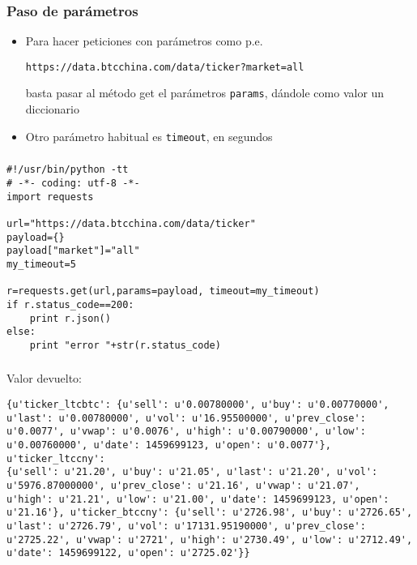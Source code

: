 \documentclass[ucs]{beamer}
\begin{document}
\begin{frame}[fragile]
\frametitle{Paso de parámetros}
\begin{itemize}
\item
Para hacer peticiones con parámetros como p.e.

  \begin{footnotesize}
  \begin{verbatim}
https://data.btcchina.com/data/ticker?market=all
  \end{verbatim}
  \end{footnotesize}

basta pasar al método get el parámetros \verb|params|, dándole como 
valor un diccionario
\item
Otro parámetro habitual es \verb|timeout|, en segundos

\end{itemize}

\end{frame}


\begin{frame}[fragile]
\frametitle{}


  \begin{footnotesize}
  \begin{verbatim}
#!/usr/bin/python -tt
# -*- coding: utf-8 -*-
import requests

url="https://data.btcchina.com/data/ticker"
payload={}
payload["market"]="all"
my_timeout=5

r=requests.get(url,params=payload, timeout=my_timeout)
if r.status_code==200:
    print r.json()
else:
    print "error "+str(r.status_code)
  \end{verbatim}
  \end{footnotesize}


\end{frame}
\begin{frame}[fragile]
\frametitle{}

Valor devuelto:

  \begin{scriptsize}
  \begin{verbatim}
{u'ticker_ltcbtc': {u'sell': u'0.00780000', u'buy': u'0.00770000',
u'last': u'0.00780000', u'vol': u'16.95500000', u'prev_close':
u'0.0077', u'vwap': u'0.0076', u'high': u'0.00790000', u'low':
u'0.00760000', u'date': 1459699123, u'open': u'0.0077'}, u'ticker_ltccny':
{u'sell': u'21.20', u'buy': u'21.05', u'last': u'21.20', u'vol':
u'5976.87000000', u'prev_close': u'21.16', u'vwap': u'21.07',
u'high': u'21.21', u'low': u'21.00', u'date': 1459699123, u'open':
u'21.16'}, u'ticker_btccny': {u'sell': u'2726.98', u'buy': u'2726.65',
u'last': u'2726.79', u'vol': u'17131.95190000', u'prev_close':
u'2725.22', u'vwap': u'2721', u'high': u'2730.49', u'low': u'2712.49',
u'date': 1459699122, u'open': u'2725.02'}}
  \end{verbatim}
  \end{scriptsize}
\end{frame}
\end{document}
